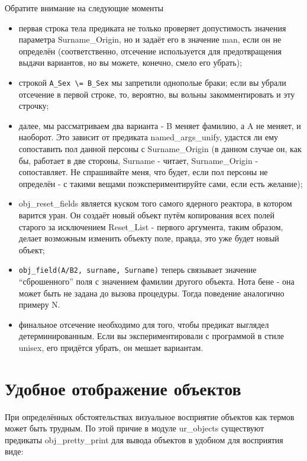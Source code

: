 \documentclass[a4paper]{book}
\begin{document}
Обратите внимание на следующие моменты

\begin{itemize}
\renewcommand{\labelitemi}{$\cdot$}
\item первая строка тела предиката не только проверяет
  допустимость значения параметра Surname\_Origin, но и задаёт
  его в значение man, если он не определён (соответственно,
  отсечение используется для предотвращения выдачи вариантов, но
  вы можете, конечно, смело его убрать);
\item строкой \verb|A_Sex \= B_Sex| мы запретили однополые браки;
  если вы убрали отсечение в первой строке, то, вероятно, вы
  вольны закомментировать и эту строчку;
\item далее, мы рассматриваем два варианта - B меняет фамилию, а
  A не меняет, и наоборот. Это зависит от предиката
  named\_args\_unify, удастся ли ему сопоставить пол данной
  персоны с Surname\_Origin (в данном случае он, как бы, работает
  в две стороны, Surname - читает, Surname\_Origin -
  сопоставляет. Не спрашивайте меня, что будет, если пол персоны
  не определён - с такими вещами поэкспериментируйте сами, если
  есть желание);
\item obj\_reset\_fields является куском того самого ядерного
  реактора, в котором варится уран. Он создаёт новый объект путём
  копирования всех полей старого за исключением Reset\_List -
  первого аргумента, таким образом, делает возможным изменить
  объекту поле, правда, это уже будет новый объект;
\item \verb|obj_field(A/B2, surname, Surname)| теперь связывает
  значение ``сброшенного'' поля с значением фамилии другого
  объекта. Нота бене - она может быть не задана до вызова
  процедуры. Тогда поведение аналогично примеру N.
\item финальное отсечение необходимо для того, чтобы предикат
  выглядел детерминированным. Если вы экспериментировали с
  программой в стиле unisex, его придётся убрать, он мешает
  вариантам.
\end{itemize}

\section{Удобное отображение объектов}

При определённых обстоятельствах визуальное восприятие объектов
как термов может быть трудным. По этой причие в модуле
ur\_objects существуют предикаты obj\_pretty\_print для вывода
объектов в удобном для восприятия виде:
\end{document}
